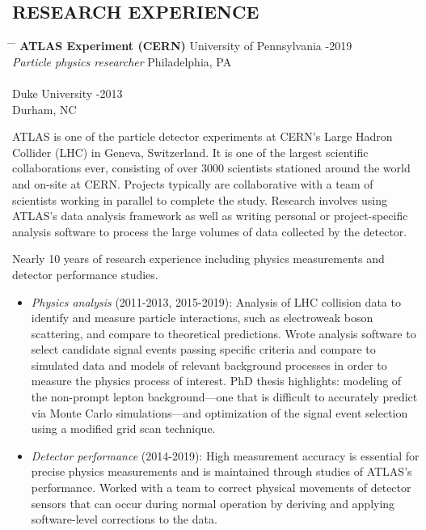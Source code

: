 \documentclass{res}
\begin{document}
\begin{resume}
\section{RESEARCH EXPERIENCE}\vspace{-5pt}
   \begin{tabbing}
   \hspace{2.5in}\= \hspace{2.85in} \= \kill %
    {\bf ATLAS Experiment (CERN)} \>University of Pennsylvania -2019\\
    {\it Particle physics researcher} \> Philadelphia, PA \\
    \\
    \> Duke University -2013 \\
    \> Durham, NC
   \end{tabbing}\vspace{-18pt}
   ATLAS is one of the particle detector experiments at CERN's Large Hadron Collider (LHC) in Geneva, Switzerland. 
   It is one of the largest scientific collaborations ever, consisting of over 3000 scientists stationed around the world and on-site at CERN.
   Projects typically are collaborative with a team of scientists working in parallel to complete the study.
   Research involves using ATLAS's data analysis framework as well as writing personal or project-specific analysis software to process the large volumes of data collected by the detector.

   Nearly 10 years of research experience including physics measurements and detector performance studies.
   \begin{itemize}
     \item {\it Physics analysis} (2011-2013, 2015-2019): Analysis of LHC collision data to identify and measure particle interactions, such as electroweak boson scattering, and compare to theoretical predictions.
           Wrote analysis software to select candidate signal events passing specific criteria and compare to simulated data and models of relevant background processes in order to measure the physics process of interest.
           PhD thesis highlights: modeling of the non-prompt lepton background---one that is difficult to accurately predict via Monte Carlo simulations---and optimization of the signal event selection using a modified grid scan technique.
     \item {\it Detector performance} (2014-2019): High measurement accuracy is essential for precise physics measurements and is maintained through studies of ATLAS's performance.
           Worked with a team to correct physical movements of detector sensors that can occur during normal operation by deriving and applying software-level corrections to the data.
   \end{itemize}


\end{resume}
\end{document}
